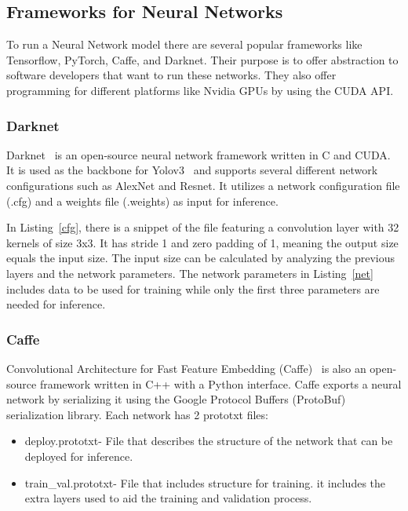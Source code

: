 
 \subsection{Frameworks for Neural Networks}
 \label{section:Darknet}

To run a Neural Network model there are several popular frameworks like
Tensorflow, PyTorch, Caffe, and Darknet.  Their purpose is to offer abstraction
to software developers that want to run these networks. They also offer
programming for different platforms like Nvidia GPUs by using the CUDA API.

\subsubsection{Darknet}

Darknet~\cite{Darknet} is an open-source neural network framework written in C
and CUDA. It is used as the backbone for Yolov3~\cite{yolov3} and supports
several different network configurations such as AlexNet and Resnet.  It
utilizes a network configuration file (.cfg) and a weights file (.weights) as
input for inference.



In Listing~\ref{cfg}, there is a snippet of the file featuring a convolution
layer with 32 kernels of size 3x3. It has stride 1 and zero padding of 1,
meaning the output size equals the input size. The input size can be
calculated by analyzing the previous layers and the network parameters. The
network parameters in Listing~\ref{net} includes data to be used for training while only
the first three parameters are needed for inference.




\subsubsection{Caffe}

Convolutional Architecture for Fast Feature Embedding (Caffe)~\cite{caffe} is
also an open-source framework written in C++ with a Python interface.  Caffe
exports a neural network by serializing it using the Google Protocol Buffers
(ProtoBuf) serialization library. Each network has 2 prototxt files:
\begin{itemize}
    \item deploy.prototxt- File that describes the structure of the network that
      can be deployed for inference.
    \item train\_val.prototxt- File that includes structure for training.  it
      includes the extra layers used to aid the training and validation process.
\end{itemize}


